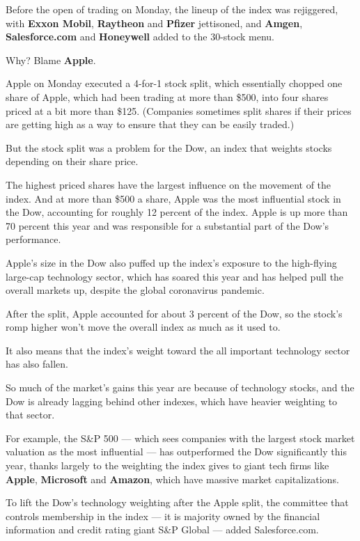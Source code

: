 Before the open of trading on Monday, the lineup of the index was
rejiggered, with \textbf{Exxon Mobil}, \textbf{Raytheon} and
\textbf{Pfizer} jettisoned, and \textbf{Amgen}, \textbf{Salesforce.com}
and \textbf{Honeywell} added to the 30-stock menu.

Why? Blame \textbf{Apple}.

Apple on Monday executed a 4-for-1 stock split, which essentially
chopped one share of Apple, which had been trading at more than \$500,
into four shares priced at a bit more than \$125. (Companies sometimes
split shares if their prices are getting high as a way to ensure that
they can be easily traded.)

But the stock split was a problem for the Dow, an index that weights
stocks depending on their share price.

The highest priced shares have the largest influence on the movement of
the index. And at more than \$500 a share, Apple was the most
influential stock in the Dow, accounting for roughly 12 percent of the
index. Apple is up more than 70 percent this year and was responsible
for a substantial part of the Dow's performance.

Apple's size in the Dow also puffed up the index's exposure to the
high-flying large-cap technology sector, which has soared this year and
has helped pull the overall markets up, despite the global coronavirus
pandemic.

After the split, Apple accounted for about 3 percent of the Dow, so the
stock's romp higher won't move the overall index as much as it used to.

It also means that the index's weight toward the all important
technology sector has also fallen.

So much of the market's gains this year are because of technology
stocks, and the Dow is already lagging behind other indexes, which have
heavier weighting to that sector.

For example, the S\&P 500 --- which sees companies with the largest
stock market valuation as the most influential --- has outperformed the
Dow significantly this year, thanks largely to the weighting the index
gives to giant tech firms like \textbf{Apple}, \textbf{Microsoft} and
\textbf{Amazon}, which have massive market capitalizations.

To lift the Dow's technology weighting after the Apple split, the
committee that controls membership in the index --- it is majority owned
by the financial information and credit rating giant S\&P Global ---
added Salesforce.com.


